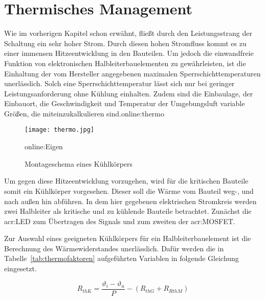 \newpage
\section{Thermisches Management}
\label{subsub:thermo}
Wie im vorherigen Kapitel schon erwähnt, fließt durch den Leistungsstrang der Schaltung ein sehr hoher Strom. Durch diesen hohen Stromfluss kommt es zu einer immensen Hitzeentwicklung in den Bauteilen. Um jedoch die einwandfreie Funktion von elektronischen Halbleiterbauelementen zu gewährleisten, ist die Einhaltung der vom Hersteller angegebenen maximalen Sperrschichttemperaturen unerlässlich. Solch eine Sperrschichttemperatur lässt sich nur bei geringer Leistungsanforderung ohne Kühlung einhalten. Zudem sind die Einbaulage, der Einbauort, die Geschwindigkeit und Temperatur der Umgebungsluft variable Größen, die miteinzukalkulieren sind.\gls{online:thermo}

\begin{figure}[H]
	\centering
	\texttt{[image: thermo.jpg]}
	\caption[Montageschema eines Kühlkörpers]{Montageschema eines Kühlkörpers} \gls{online:Eigen}
	\label{fig:thermo}
\end{figure}

Um gegen diese Hitzeentwicklung vorzugehen, wird für die kritischen Bauteile somit ein Kühlkörper vorgesehen. Dieser soll die Wärme vom Bauteil weg-, und nach außen hin abführen. In dem hier gegebenen elektrischen Stromkreis werden zwei Halbleiter als kritische und zu kühlende Bauteile betrachtet. Zunächst die \gls{acr:LED} zum Übertragen des Signals und zum zweiten der \gls{acr:MOSFET}.\cite{thermLED}

Zur Auswahl eines geeigneten Kühlkörpers für ein Halbleiterbauelement ist die Berechnung des Wärmewiderstandes unerlässlich. Dafür werden die in Tabelle~\ref{tab:thermofaktoren} aufgeführten Variablen in folgende Gleichung eingesetzt.

\begin{equation}
	\label{equ:thermo}
	R_{thK} = \frac{\vartheta_{i}-\vartheta_{u}}{P}-(R_{thG}+R_{RthM})
\end{equation}

